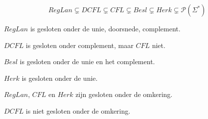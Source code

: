 \documentclass[main.tex]{subfiles}
\begin{document}
\begin{st}
  \[ RegLan \subsetneq DCFL \subsetneq CFL \subsetneq Besl \subsetneq Herk \subsetneq \mathcal{P}(\Sigma^{*}) \]
\end{st}

\begin{st}
  $RegLan$ is gesloten onder de unie, doorsnede, complement.
\end{st}

\begin{st}
  $DCFL$ is gesloten onder complement, maar $CFL$ niet. 
\end{st}

\begin{st}
  $Besl$ is gesloten onder de unie en het complement.
\end{st}

\begin{st}
  $Herk$ is gesloten onder de unie.
\end{st}

\begin{st}
  $RegLan$, $CFL$ en $Herk$ zijn gesloten onder de omkering.
\end{st}

\begin{st}
  $DCFL$ is niet gesloten onder de omkering.
\end{st}
\end{document}
